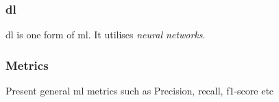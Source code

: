\subsubsection{\acrfull{dl}}


\acrlong{dl} is one form of \acrlong{ml}. It utilises \textit{neural networks}.

\subsubsection{Metrics}

Present general \acrshort{ml} metrics such as Precision, recall, f1-score etc

